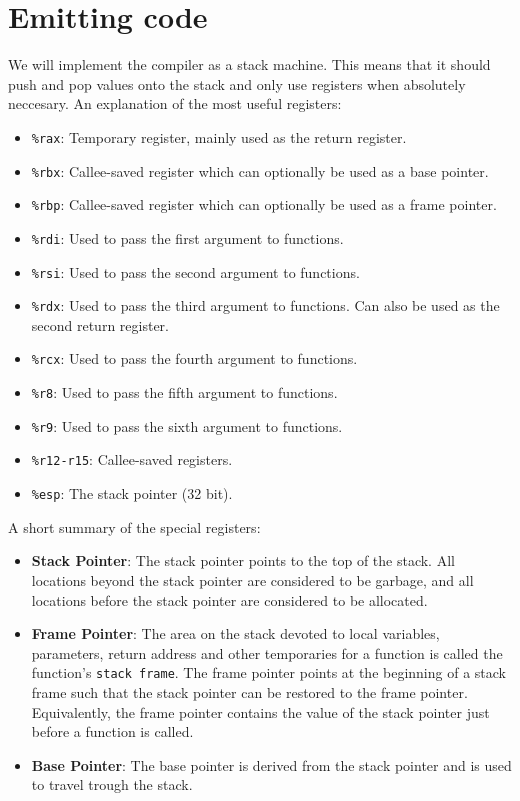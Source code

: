 \documentclass{report}
\begin{document}
	\section{Emitting code}
	We will implement the compiler as a stack machine. This means that it should push and pop values onto the stack and only use registers when absolutely neccesary. An explanation of the most useful registers:
	\begin{itemize}
		\item \texttt{\%rax}: Temporary register, mainly used as the return register.
		\item \texttt{\%rbx}: Callee-saved register which can optionally be used as a base pointer.
		\item \texttt{\%rbp}: Callee-saved register which can optionally be used as a frame pointer.
		\item \texttt{\%rdi}: Used to pass the first argument to functions.
		\item \texttt{\%rsi}: Used to pass the second argument to functions.
		\item \texttt{\%rdx}: Used to pass the third argument to functions. Can also be used as the second return register.
		\item \texttt{\%rcx}: Used to pass the fourth argument to functions.
		\item \texttt{\%r8}: Used to pass the fifth argument to functions.
		\item \texttt{\%r9}: Used to pass the sixth argument to functions.
		\item \texttt{\%r12-r15}: Callee-saved registers.
		\item \texttt{\%esp}: The stack pointer (32 bit).
	\end{itemize}
	A short summary of the special registers:
	\begin{itemize}
		\item \textbf{Stack Pointer}: The stack pointer points to the top of the stack. All locations beyond the stack pointer are considered to be garbage, and all locations before the stack pointer are considered to be allocated.
		\item \textbf{Frame Pointer}: The area on the stack devoted to local variables, parameters, return address and other temporaries for a function is called the function's \texttt{stack frame}. The frame pointer points at the beginning of a stack frame such that the stack pointer can be restored to the frame pointer. Equivalently, the frame pointer contains the value of the stack pointer just before a function is called.
		\item \textbf{Base Pointer}: The base pointer is derived from the stack pointer and is used to travel trough the stack.
	\end{itemize}
	
\end{document}
